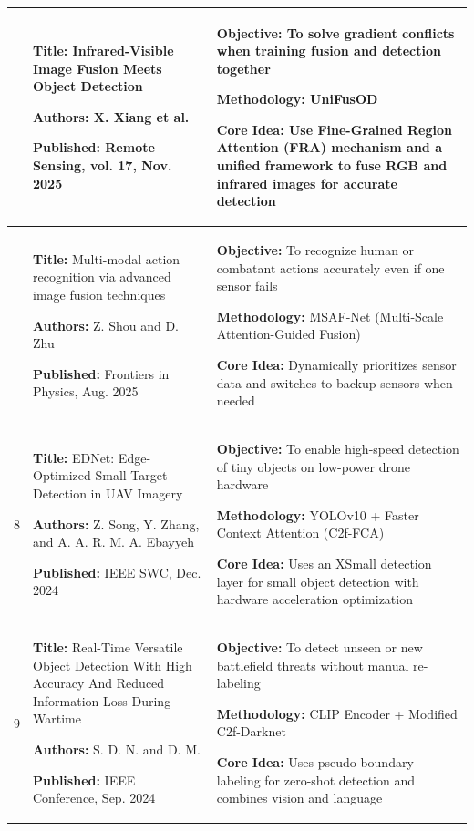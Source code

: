 \begin{longtable}{|>{\centering\arraybackslash}p{1.2cm}|p{6.3cm}|p{6.3cm}|}
  6 &
  \textbf{Title:} Infrared-Visible Image Fusion Meets Object Detection \par
  \textbf{Authors:} X. Xiang et al. \par
  \textbf{Published:} Remote Sensing, vol. 17, Nov. 2025 &
  \textbf{Objective:} To solve gradient conflicts when training fusion and detection together \par
  \textbf{Methodology:} UniFusOD \par
  \textbf{Core Idea:} Use Fine-Grained Region Attention (FRA) mechanism and a unified framework to fuse RGB and infrared images for accurate detection \\
  \hline

  7 &
  \textbf{Title:} Multi-modal action recognition via advanced image fusion techniques \par
  \textbf{Authors:} Z. Shou and D. Zhu \par
  \textbf{Published:} Frontiers in Physics, Aug. 2025 &
  \textbf{Objective:} To recognize human or combatant actions accurately even if one sensor fails \par
  \textbf{Methodology:} MSAF-Net (Multi-Scale Attention-Guided Fusion) \par
  \textbf{Core Idea:} Dynamically prioritizes sensor data and switches to backup sensors when needed \\
  \hline

  8 &
  \textbf{Title:} EDNet: Edge-Optimized Small Target Detection in UAV Imagery \par
  \textbf{Authors:} Z. Song, Y. Zhang, and A. A. R. M. A. Ebayyeh \par
  \textbf{Published:} IEEE SWC, Dec. 2024 &
  \textbf{Objective:} To enable high-speed detection of tiny objects on low-power drone hardware \par
  \textbf{Methodology:} YOLOv10 + Faster Context Attention (C2f-FCA) \par
  \textbf{Core Idea:} Uses an XSmall detection layer for small object detection with hardware acceleration optimization \\
  \hline

  9 &
  \textbf{Title:} Real-Time Versatile Object Detection With High Accuracy And Reduced Information Loss During Wartime \par
  \textbf{Authors:} S. D. N. and D. M. \par
  \textbf{Published:} IEEE Conference, Sep. 2024 &
  \textbf{Objective:} To detect unseen or new battlefield threats without manual re-labeling \par
  \textbf{Methodology:} CLIP Encoder + Modified C2f-Darknet \par
  \textbf{Core Idea:} Uses pseudo-boundary labeling for zero-shot detection and combines vision and language \\
  \hline


\end{longtable}
